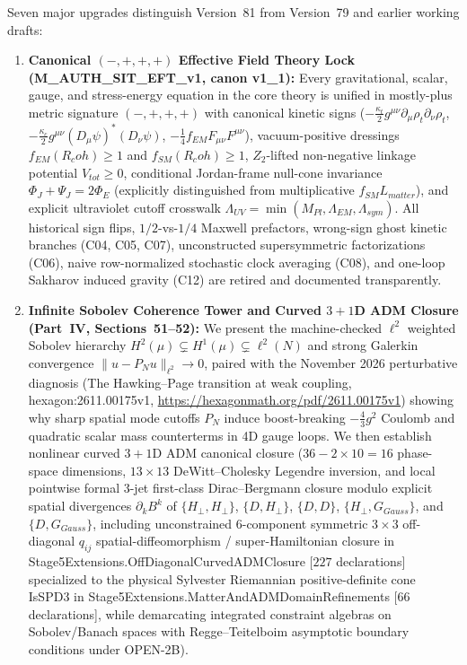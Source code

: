 \documentclass[american,11pt,letterpaper]{article}
\newcommand{\Rcoh}{R_{\mathrm{coh}}}
\def\mathbb#1{#1}%
\def\mathcal#1{#1}%
\def\mathrm#1{#1}%
\def\texttt#1{#1}%
\def\emph#1{#1}%
\def\Rcoh{R_coh}%
\begin{document}
Seven major upgrades distinguish Version~81 from Version~79 and earlier working drafts:
\begin{enumerate}[leftmargin=2em]
  \item \textbf{Canonical $(-,+,+,+)$ Effective Field Theory Lock (\texttt{M\_AUTH\_SIT\_EFT\_v1}, canon \texttt{v1\_1}):} Every gravitational, scalar, gauge, and stress-energy equation in the core theory is unified in mostly-plus metric signature $(-,+,+,+)$ with canonical kinetic signs ($-\frac{\kappa_t}{2}g^{\mu\nu}\partial_\mu\rho_t\partial_\nu\rho_t$, $-\frac{\kappa_c}{2}g^{\mu\nu}(D_\mu\psi)^*(D_\nu\psi)$, $-\frac{1}{4}f_{\mathrm{EM}}F_{\mu\nu}F^{\mu\nu}$), vacuum-positive dressings $f_{\mathrm{EM}}(\Rcoh) \ge 1$ and $f_{\mathrm{SM}}(\Rcoh) \ge 1$, $\mathbb{Z}_2$-lifted non-negative linkage potential $V_{\mathrm{tot}} \ge 0$, conditional Jordan-frame null-cone invariance $\Phi_J + \Psi_J = 2\Phi_E$ (explicitly distinguished from multiplicative $f_{\mathrm{SM}}\mathcal{L}_{\mathrm{matter}}$), and explicit ultraviolet cutoff crosswalk $\Lambda_{\mathrm{UV}} = \min(M_{\mathrm{Pl}}, \Lambda_{\mathrm{EM}}, \Lambda_{\mathrm{sym}})$. All historical sign flips, $1/2$-vs-$1/4$ Maxwell prefactors, wrong-sign ghost kinetic branches (\texttt{C04}, \texttt{C05}, \texttt{C07}), unconstructed supersymmetric factorizations (\texttt{C06}), naive row-normalized stochastic clock averaging (\texttt{C08}), and one-loop Sakharov induced gravity (\texttt{C12}) are retired and documented transparently.
  \item \textbf{Infinite Sobolev Coherence Tower and Curved $3+1$D ADM Closure (Part~IV, Sections~51--52):} We present the machine-checked $\ell^2$ weighted Sobolev hierarchy $H^2(\mu) \subsetneq H^1(\mu) \subsetneq \ell^2(\mathbb{N})$ and strong Galerkin convergence $\|u - P_N u\|_{\ell^2} \to 0$, paired with the November 2026 perturbative diagnosis (\emph{The Hawking--Page transition at weak coupling}, \texttt{hexagon:2611.00175v1}, \url{https://hexagonmath.org/pdf/2611.00175v1}) showing why sharp spatial mode cutoffs $P_N$ induce boost-breaking $-\frac{4}{3}g^2$ Coulomb and quadratic scalar mass counterterms in 4D gauge loops. We then establish nonlinear curved $3+1$D ADM canonical closure ($36 - 2\times 10 = 16$ phase-space dimensions, $13\times 13$ DeWitt--Cholesky Legendre inversion, and local pointwise formal 3-jet first-class Dirac--Bergmann closure modulo explicit spatial divergences $\partial_k B^k$ of $\{\mathcal{H}_\perp,\mathcal{H}_\perp\}$, $\{\mathcal{D},\mathcal{H}_\perp\}$, $\{\mathcal{D},\mathcal{D}\}$, $\{\mathcal{H}_\perp,G_{\mathrm{Gauss}}\}$, and $\{\mathcal{D},G_{\mathrm{Gauss}}\}$, including unconstrained 6-component symmetric $3\times 3$ off-diagonal $q_{ij}$ spatial-diffeomorphism / super-Hamiltonian closure in \texttt{Stage5\allowbreak{}Extensions.\allowbreak{}Off\allowbreak{}Diagonal\allowbreak{}Curved\allowbreak{}ADMClosure} [$227$ declarations] specialized to the physical Sylvester Riemannian positive-definite cone \texttt{IsSPD3} in \texttt{Stage5\allowbreak{}Extensions.\allowbreak{}Matter\allowbreak{}And\allowbreak{}ADMDomain\allowbreak{}Refinements} [$66$ declarations], while demarcating integrated constraint algebras on Sobolev/Banach spaces with Regge--Teitelboim asymptotic boundary conditions under \texttt{OPEN-2B}).

\end{enumerate}
\end{document}
